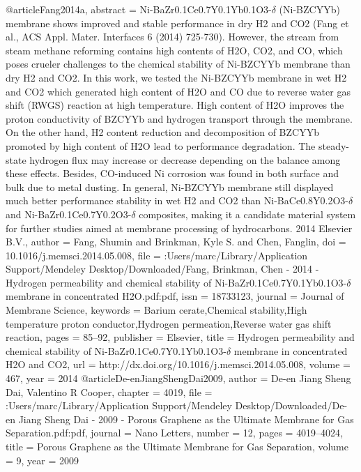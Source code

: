 @article{Fang2014a,
abstract = {Ni-BaZr0.1Ce0.7Y0.1Yb0.1O3-$\delta$ (Ni-BZCYYb) membrane shows improved and stable performance in dry H2 and CO2 (Fang et al., ACS Appl. Mater. Interfaces 6 (2014) 725-730). However, the stream from steam methane reforming contains high contents of H2O, CO2, and CO, which poses crueler challenges to the chemical stability of Ni-BZCYYb membrane than dry H2 and CO2. In this work, we tested the Ni-BZCYYb membrane in wet H2 and CO2 which generated high content of H2O and CO due to reverse water gas shift (RWGS) reaction at high temperature. High content of H2O improves the proton conductivity of BZCYYb and hydrogen transport through the membrane. On the other hand, H2 content reduction and decomposition of BZCYYb promoted by high content of H2O lead to performance degradation. The steady-state hydrogen flux may increase or decrease depending on the balance among these effects. Besides, CO-induced Ni corrosion was found in both surface and bulk due to metal dusting. In general, Ni-BZCYYb membrane still displayed much better performance stability in wet H2 and CO2 than Ni-BaCe0.8Y0.2O3-$\delta$ and Ni-BaZr0.1Ce0.7Y0.2O3-$\delta$ composites, making it a candidate material system for further studies aimed at membrane processing of hydrocarbons. {\textcopyright} 2014 Elsevier B.V.},
author = {Fang, Shumin and Brinkman, Kyle S. and Chen, Fanglin},
doi = {10.1016/j.memsci.2014.05.008},
file = {:Users/marc/Library/Application Support/Mendeley Desktop/Downloaded/Fang, Brinkman, Chen - 2014 - Hydrogen permeability and chemical stability of Ni-BaZr0.1Ce0.7Y0.1Yb0.1O3-$\delta$ membrane in concentrated H2O.pdf:pdf},
issn = {18733123},
journal = {Journal of Membrane Science},
keywords = {Barium cerate,Chemical stability,High temperature proton conductor,Hydrogen permeation,Reverse water gas shift reaction},
pages = {85--92},
publisher = {Elsevier},
title = {{Hydrogen permeability and chemical stability of Ni-BaZr0.1Ce0.7Y0.1Yb0.1O3-$\delta$ membrane in concentrated H2O and CO2}},
url = {http://dx.doi.org/10.1016/j.memsci.2014.05.008},
volume = {467},
year = {2014}
}
@article{De-enJiangShengDai2009,
author = {{De-en Jiang  Sheng Dai}, Valentino R Cooper},
chapter = {4019},
file = {:Users/marc/Library/Application Support/Mendeley Desktop/Downloaded/De-en Jiang Sheng Dai - 2009 - Porous Graphene as the Ultimate Membrane for Gas Separation.pdf:pdf},
journal = {Nano Letters},
number = {12},
pages = {4019--4024},
title = {{Porous Graphene as the Ultimate Membrane for Gas Separation}},
volume = {9},
year = {2009}
}
